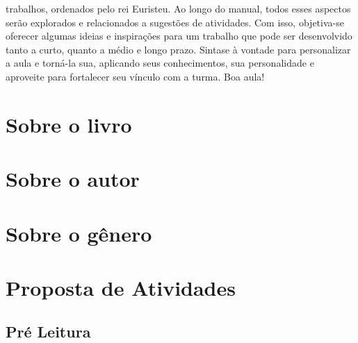 \documentclass[11pt]{extarticle}
\begin{document}
trabalhos, ordenados pelo rei Euristeu. Ao longo do manual, todos esses aspectos serão explorados e relacionados a sugestões de atividades. Com isso, objetiva-se oferecer algumas ideias e inspirações para um trabalho que pode ser desenvolvido tanto a curto, quanto a médio e longo prazo. Sintase à vontade para personalizar a aula e torná-la sua, aplicando seus conhecimentos, sua personalidade e aproveite para fortalecer seu vínculo com a turma. Boa aula! 


\section{Sobre o livro}

\section{Sobre o autor}

\section{Sobre o gênero}

\section{Proposta de Atividades}
\subsection{Pré Leitura}

\end{document}
